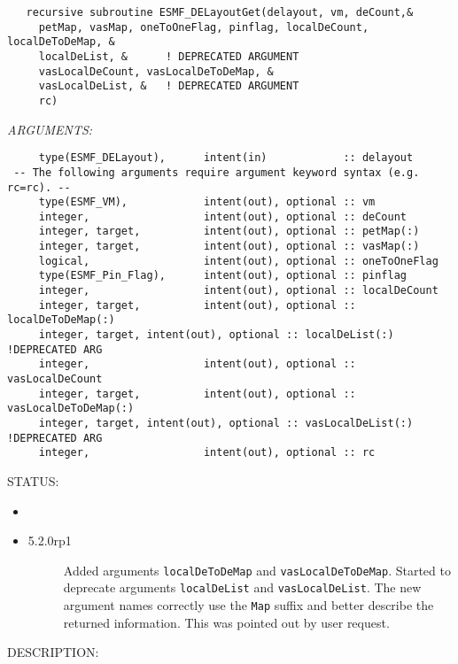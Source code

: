  
\begin{verbatim}   recursive subroutine ESMF_DELayoutGet(delayout, vm, deCount,&
     petMap, vasMap, oneToOneFlag, pinflag, localDeCount, localDeToDeMap, &
     localDeList, &      ! DEPRECATED ARGUMENT
     vasLocalDeCount, vasLocalDeToDeMap, &
     vasLocalDeList, &   ! DEPRECATED ARGUMENT
     rc)\end{verbatim}{\em ARGUMENTS:}
\begin{verbatim}     type(ESMF_DELayout),      intent(in)            :: delayout
 -- The following arguments require argument keyword syntax (e.g. rc=rc). --
     type(ESMF_VM),            intent(out), optional :: vm
     integer,                  intent(out), optional :: deCount
     integer, target,          intent(out), optional :: petMap(:)
     integer, target,          intent(out), optional :: vasMap(:)
     logical,                  intent(out), optional :: oneToOneFlag
     type(ESMF_Pin_Flag),      intent(out), optional :: pinflag
     integer,                  intent(out), optional :: localDeCount
     integer, target,          intent(out), optional :: localDeToDeMap(:)
     integer, target, intent(out), optional :: localDeList(:)  !DEPRECATED ARG
     integer,                  intent(out), optional :: vasLocalDeCount
     integer, target,          intent(out), optional :: vasLocalDeToDeMap(:)
     integer, target, intent(out), optional :: vasLocalDeList(:) !DEPRECATED ARG
     integer,                  intent(out), optional :: rc  \end{verbatim}
{\sf STATUS:}
   \begin{itemize}
   \item{}
   \item{}
   \begin{description}
   \item[5.2.0rp1] Added arguments {\tt localDeToDeMap} and {\tt vasLocalDeToDeMap}.
                   Started to deprecate arguments {\tt localDeList} and 
                   {\tt vasLocalDeList}. 
                   The new argument names correctly use the {\tt Map} suffix and
                   better describe the returned information.
                   This was pointed out by user request.
   \end{description}
   \end{itemize}
  
{\sf DESCRIPTION:\\ }


